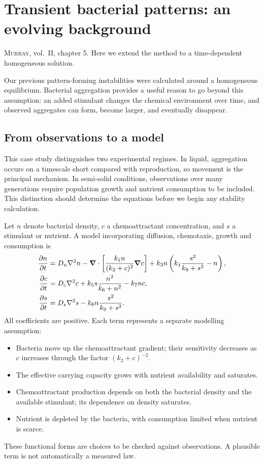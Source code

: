 \documentclass[main.tex]{subfiles}
\begin{document}
\chapter{Transient bacterial patterns: an evolving background}
\label{merged:bacteria}
\begin{extra-reading}
\textsc{Murray}, vol.~II, chapter 5. Here we extend the method to a time-dependent homogeneous solution.
\end{extra-reading}
Our previous pattern-forming instabilities were calculated around a homogeneous equilibrium. Bacterial aggregation provides a useful reason to go beyond this assumption: an added stimulant changes the chemical environment over time, and observed aggregates can form, become larger, and eventually disappear.

\section{From observations to a model}
This case study distinguishes two experimental regimes. In liquid, aggregation occurs on a timescale short compared with reproduction, so movement is the principal mechanism. In semi-solid conditions, observations over many generations require population growth and nutrient consumption to be included. This distinction should determine the equations before we begin any stability calculation.

Let $n$ denote bacterial density, $c$ a chemoattractant concentration, and $s$ a stimulant or nutrient. A model incorporating diffusion, chemotaxis, growth and consumption is
\begin{align}\label{merged:bacteriafull}
\pd{n}{t}&=D_n\nabla^2n-\vnabla\cdot\left[\frac{k_1n}{(k_2+c)^2}\vnabla c\right]
+k_3n\left(k_4\frac{s^2}{k_9+s^2}-n\right),\\
\pd{c}{t}&=D_c\nabla^2c+k_5s\frac{n^2}{k_6+n^2}-k_7nc,\\
\pd{s}{t}&=D_s\nabla^2s-k_8n\frac{s^2}{k_9+s^2}.
\end{align}
All coefficients are positive. Each term represents a separate modelling assumption:
\begin{itemize}
\item Bacteria move up the chemoattractant gradient; their sensitivity decreases as $c$ increases through the factor $(k_2+c)^{-2}$.
\item The effective carrying capacity grows with nutrient availability and saturates.
\item Chemoattractant production depends on both the bacterial density and the available stimulant; its dependence on density saturates.
\item Nutrient is depleted by the bacteria, with consumption limited when nutrient is scarce.
\end{itemize}
These functional forms are choices to be checked against observations. A plausible term is not automatically a measured law.
\end{document}
